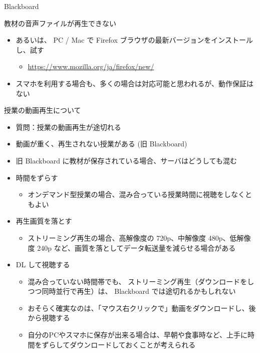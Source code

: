 \documentclass[a4j,10pt]{jsarticle}
\begin{document}
{\begin{frame}[label={sec:orgc119bb0},fragile]{Blackboard}
\begin{block}{教材の音声ファイルが再生できない}
\begin{itemize}
\begin{itemize}
\item Web ブラウザを変更するだけで解決することも多い
\end{itemize}
\par
\item あるいは、 PC / Mac で Firefox ブラウザの最新バージョンをインストールし、試す
\begin{itemize}
\item \url{https://www.mozilla.org/ja/firefox/new/}
\end{itemize}
\par
\item スマホを利用する場合も、多くの場合は対応可能と思われるが、動作保証はない
\end{itemize}
\end{block}
\par
\begin{block}{授業の動画再生について}
\begin{itemize}
\item 質問：授業の動画再生が途切れる
\par
\item 動画が重く、再生されない授業がある (旧 Blackboard)
\item 旧 Blackboard に教材が保存されている場合、サーバはどうしても混む
\par
\item 時間をずらす
\begin{itemize}
\item オンデマンド型授業の場合、混み合っている授業時間に視聴をしなくともよい
\end{itemize}
\par
\item 再生画質を落とす
\begin{itemize}
\item ストリーミング再生の場合、高解像度の 720p、中解像度 480p、低解像度 240p など、画質を落としてデータ転送量を減らせる場合がある
\end{itemize}
\par
\item DL して視聴する
\begin{itemize}
\item 混み合っていない時間帯でも、 ストリーミング再生（ダウンロードをしつつ同時並行で再生）は、 Blackboard では途切れるかもしれない
\item おそらく確実なのは、「マウス右クリックで」動画をダウンロードし、後から視聴する
\item 自分のPCやスマホに保存が出来る場合は、早朝や食事時など、上手に時間をずらしてダウンロードしておくことが考えられる

\end{itemize}
\end{itemize}
\end{block}
\end{frame}}
\end{document}
